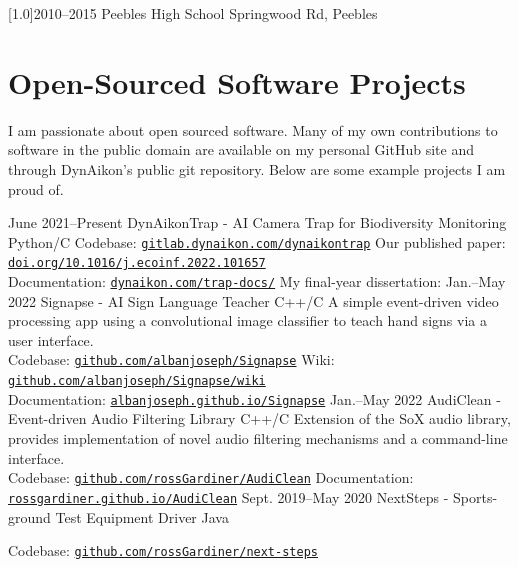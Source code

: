 \documentclass[]{cv-style}     %
\begin{document}
\begin{minipage}[b]{1.4\textwidth}
\begin{entrylist}
\entry
{\scalebox{.8}[1.0]{2010--2015}}
{Peebles High School}
{Springwood Rd, Peebles}

\end{entrylist}
\end{minipage}

\hspace*{-5.5cm}\begin{minipage}[b]{1.4\textwidth}
\vspace{-0.4cm}
\section{Open-Sourced Software Projects}
  \vspace{0.2cm}
I am passionate about open sourced software. Many of my own contributions to software in the public domain are available on my personal GitHub site and through DynAikon's public git repository. Below are some example projects I am proud of.
\vspace{0.1cm}
\begin{entrylist}
\entry
{June 2021--Present}
{DynAikonTrap - AI Camera Trap for Biodiversity Monitoring}
{Python/C}
{
Codebase: \href{https://gitlab.dynaikon.com/dynaikontrap}{\texttt{gitlab.dynaikon.com/dynaikontrap}} Our published paper: \href{https://doi.org/10.1016/j.ecoinf.2022.101657}{\texttt{doi.org/10.1016/j.ecoinf.2022.101657}}\\
Documentation: \href{https://dynaikon.com/trap-docs/}{\texttt{dynaikon.com/trap-docs/}} My final-year dissertation: \href{}{\texttt{}}
}
\entry
{Jan.--May 2022}
{Signapse - AI Sign Language Teacher}
{C++/C}
{
A simple event-driven video processing app using a convolutional image classifier to teach hand signs via a user interface. \\
Codebase: \href{https://github.com/albanjoseph/Signapse}{\texttt{github.com/albanjoseph/Signapse}} Wiki: \href{https://github.com/albanjoseph/Signapse/wiki}{\texttt{github.com/albanjoseph/Signapse/wiki}} \\
Documentation: \href{https://albanjoseph.github.io/Signapse/html/annotated.html}{\texttt{albanjoseph.github.io/Signapse}}
}
\entry
{Jan.--May 2022}
{AudiClean - Event-driven Audio Filtering Library}
{C++/C}
{
Extension of the SoX audio library, provides implementation of novel audio filtering mechanisms and a command-line interface.\\
Codebase: \href{https://github.com/rossGardiner/AudiClean}{\texttt{github.com/rossGardiner/AudiClean}} Documentation: \href{https://rossgardiner.github.io/AudiClean/html/annotated.html}{\texttt{rossgardiner.github.io/AudiClean}}
} 
\entry
{Sept. 2019--May 2020}
{NextSteps - Sports-ground Test Equipment Driver}
{Java}
{
Codebase: \href{https://github.com/rossGardiner/next-steps}{\texttt{github.com/rossGardiner/next-steps}}


}
\end{entrylist}
\end{minipage}
\end{document}
